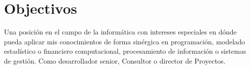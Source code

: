 \section{Objectivos}

Una posición en el campo de la informática con intereses especiales en dónde pueda aplicar mis
conocimientos de forma sinérgica en programación, modelado estadístico o financiero computacional,
procesamiento de información o sistemas de gestión. Como desarrollador senior, Consultor o director de Proyectos.

